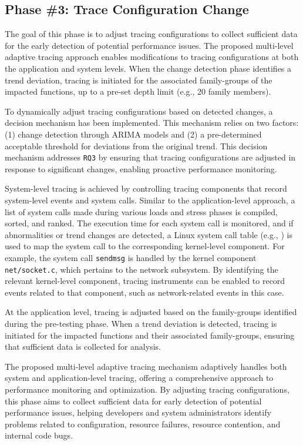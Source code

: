 \documentclass[pdflatex,sn-nature]{sn-jnl}%
\theoremstyle{thmstyleone}%
\theoremstyle{thmstyletwo}%
\theoremstyle{thmstylethree}%
\begin{document}
\subsection{Phase \#3: Trace Configuration Change}

The goal of this phase is to adjust tracing configurations to collect sufficient data for the early detection of potential performance issues. The proposed multi-level adaptive tracing approach enables modifications to tracing configurations at both the application and system levels. When the change detection phase identifies a trend deviation, tracing is initiated for the associated family-groups of the impacted functions, up to a pre-set depth limit (e.g., 20 family members).

To dynamically adjust tracing configurations based on detected changes, a decision mechanism has been implemented. This mechanism relies on two factors: (1) change detection through ARIMA models and (2) a pre-determined acceptable threshold for deviations from the original trend. This decision mechanism addresses \verb|RQ3| by ensuring that tracing configurations are adjusted in response to significant changes, enabling proactive performance monitoring.

System-level tracing is achieved by controlling tracing components that record system-level events and system calls. Similar to the application-level approach, a list of system calls made during various loads and stress phases is compiled, sorted, and ranked. The execution time for each system call is monitored, and if abnormalities or trend changes are detected, a Linux system call table (e.g., \cite{valsorda-no-date}) is used to map the system call to the corresponding kernel-level component. For example, the system call \texttt{sendmsg} is handled by the kernel component \texttt{net/socket.c}, which pertains to the network subsystem. By identifying the relevant kernel-level component, tracing instruments can be enabled to record events related to that component, such as network-related events in this case.

At the application level, tracing is adjusted based on the family-groups identified during the pre-testing phase. When a trend deviation is detected, tracing is initiated for the impacted functions and their associated family-groups, ensuring that sufficient data is collected for analysis.

The proposed multi-level adaptive tracing mechanism adaptively handles both system and application-level tracing, offering a comprehensive approach to performance monitoring and optimization. By adjusting tracing configurations, this phase aims to collect sufficient data for early detection of potential performance issues, helping developers and system administrators identify problems related to configuration, resource failures, resource contention, and internal code bugs.
\end{document}
